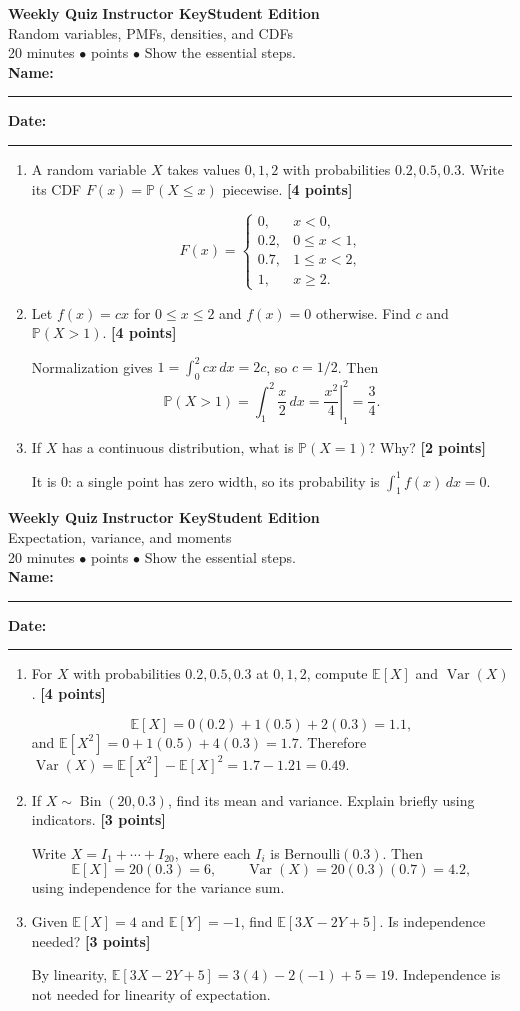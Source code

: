 \documentclass[11pt]{article}
\newcounter{quiznum}
\newcommand{\E}{\mathbb E}
\newcommand{\Var}{\operatorname{Var}}
\newcommand{\Prob}{\mathbb P}
\newcommand{\edition}{\ifanswers Instructor Key\else Student Edition\fi}
\newcommand{\points}[1]{\hfill{\small\color{rose}\textbf{[#1 points]}}}
\newcommand{\quizheading}[1]{%
  \clearpage\stepcounter{quiznum}%
  \begin{tcolorbox}[
    enhanced,colback=paper,colframe=indigo,boxrule=1.1pt,arc=2mm,
    left=4mm,right=4mm,top=2.5mm,bottom=2.5mm,
    borderline west={4pt}{0pt}{violet}]
    {\Large\bfseries\color{indigo}Weekly Quiz \thequiznum}\hfill
    {\bfseries\color{violet}\edition}\\[-1pt]
    {\large\color{ink}#1}\\[2pt]
    {\small\color{muted}20 minutes \quad $\bullet$ \quad 10 points \quad $\bullet$ \quad Show the essential steps.}
    \ifanswers\else
      \\[5pt]\textbf{Name:}\ \rule{0.48\linewidth}{0.4pt}\hfill
      \textbf{Date:}\ \rule{0.20\linewidth}{0.4pt}
    \fi
  \end{tcolorbox}
}
\begin{document}
\quizheading{Random variables, PMFs, densities, and CDFs}
\begin{enumerate}
  \item A random variable $X$ takes values $0,1,2$ with probabilities
  $0.2,0.5,0.3$. Write its CDF $F(x)=\Prob(X\le x)$ piecewise. \points{4}
  \begin{solution}[1.55in]
    \[
    F(x)=
    \begin{cases}
      0,&x<0,\\
      0.2,&0\le x<1,\\
      0.7,&1\le x<2,\\
      1,&x\ge2.
    \end{cases}
    \]
  \end{solution}

  \item Let $f(x)=cx$ for $0\le x\le2$ and $f(x)=0$ otherwise. Find $c$ and
  $\Prob(X>1)$. \points{4}
  \begin{solution}[1.45in]
    Normalization gives $1=\int_0^2cx\,dx=2c$, so $c=1/2$. Then
    \[
      \Prob(X>1)=\int_1^2\frac{x}{2}\,dx
      =\left.\frac{x^2}{4}\right|_1^2=\frac34.
    \]
  \end{solution}

  \item If $X$ has a continuous distribution, what is $\Prob(X=1)$? Why?
  \points{2}
  \begin{solution}[0.9in]
    It is $0$: a single point has zero width, so its probability is
    $\int_1^1 f(x)\,dx=0$.
  \end{solution}
\end{enumerate}

\quizheading{Expectation, variance, and moments}
\begin{enumerate}
  \item For $X$ with probabilities $0.2,0.5,0.3$ at $0,1,2$, compute
  $\E[X]$ and $\Var(X)$. \points{4}
  \begin{solution}[1.45in]
    \[
      \E[X]=0(0.2)+1(0.5)+2(0.3)=1.1,
    \]
    and $\E[X^2]=0+1(0.5)+4(0.3)=1.7$. Therefore
    $\Var(X)=\E[X^2]-\E[X]^2=1.7-1.21=0.49$.
  \end{solution}

  \item If $X\sim\operatorname{Bin}(20,0.3)$, find its mean and variance. Explain
  briefly using indicators. \points{3}
  \begin{solution}[1.3in]
    Write $X=I_1+\cdots+I_{20}$, where each $I_i$ is Bernoulli$(0.3)$. Then
    \[
      \E[X]=20(0.3)=6,
      \qquad \Var(X)=20(0.3)(0.7)=4.2,
    \]
    using independence for the variance sum.
  \end{solution}

  \item Given $\E[X]=4$ and $\E[Y]=-1$, find $\E[3X-2Y+5]$. Is independence
  needed? \points{3}
  \begin{solution}[1.1in]
    By linearity,
    $\E[3X-2Y+5]=3(4)-2(-1)+5=19$. Independence is not needed for linearity of
    expectation.
  \end{solution}
\end{enumerate}
\end{document}
